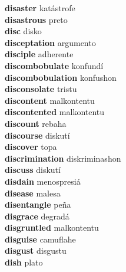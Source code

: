 \textbf{disaster } katástrofe \\
\textbf{disastrous } preto \\
\textbf{disc } disko \\
\textbf{disceptation } argumento \\
\textbf{disciple } adherente \\
\textbf{discombobulate } konfundí \\
\textbf{discombobulation } konfushon \\
\textbf{disconsolate } tristu \\
\textbf{discontent } malkontentu \\
\textbf{discontented } malkontentu \\
\textbf{discount } rebaha \\
\textbf{discourse } diskutí \\
\textbf{discover } topa \\
\textbf{discrimination } diskriminashon \\
\textbf{discuss } diskutí \\
\textbf{disdain } menospresiá \\
\textbf{disease } malesa \\
\textbf{disentangle } peña \\
\textbf{disgrace } degradá \\
\textbf{disgruntled } malkontentu \\
\textbf{disguise } camuflahe \\
\textbf{disgust } disgustu \\
\textbf{dish } plato \\
